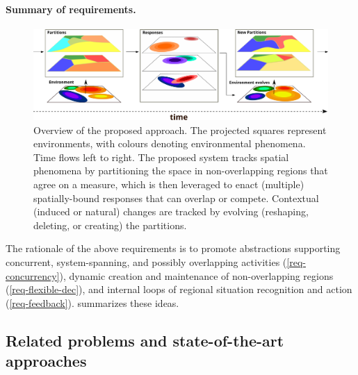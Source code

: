 \paragraph{Summary of requirements.}
\begin{figure}
  \centering
  \includegraphics[width=\linewidth]{papers/ieee2022/img/approach-images/action-with-multilayer.pdf}
  \caption[Overview of the dynamic decentralization domains approach]{
    Overview of the proposed approach.
    The projected squares represent environments,
    with colours denoting environmental phenomena. %
    Time flows left to right.
    The proposed system tracks spatial phenomena
    by partitioning the space in non-overlapping regions that agree on a measure,
    which is then leveraged to enact (multiple) spatially-bound responses
    that can %
    overlap or compete.
    Contextual (induced or natural) changes
    are tracked by evolving (reshaping, deleting, or creating) the partitions.
  }
  \label{fig:high-level-description}
\end{figure}

The rationale of the above requirements %
 is to 
 promote abstractions 
 supporting concurrent, system-spanning, and possibly overlapping activities (\ref{req-concurrency}),
 dynamic creation and maintenance of non-overlapping regions (\ref{req-flexible-dec}),
 and 
 internal loops of regional situation recognition and action
 (\ref{req-feedback}).
  summarizes these ideas.

\subsection{Related problems and state-of-the-art approaches}


